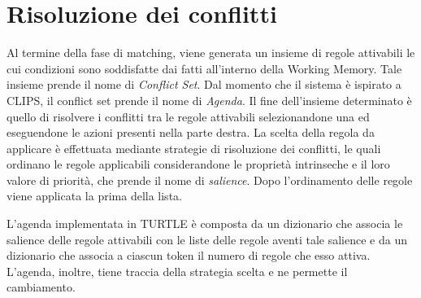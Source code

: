 \section{Risoluzione dei conflitti}
Al termine della fase di matching, viene generata un insieme di regole attivabili le cui condizioni sono soddisfatte dai fatti all'interno della Working Memory. Tale insieme prende il nome di \emph{Conflict Set}. Dal momento che il sistema è ispirato a CLIPS, il conflict set prende il nome di \emph{Agenda}. Il fine dell'insieme determinato è quello di risolvere i conflitti tra le regole attivabili selezionandone una ed eseguendone le azioni presenti nella parte destra. La scelta della regola da applicare è effettuata mediante strategie di risoluzione dei conflitti, le quali ordinano le regole applicabili considerandone le proprietà intrinseche e il loro valore di priorità, che prende il nome di \emph{salience}. Dopo l'ordinamento delle regole viene applicata la prima della lista.


L'agenda implementata in TURTLE è composta da un dizionario che associa le salience delle regole attivabili con le liste delle regole aventi tale salience e da un dizionario che associa a ciascun token il numero di regole che esso attiva. L'agenda, inoltre, tiene traccia della strategia scelta e ne permette il cambiamento.


